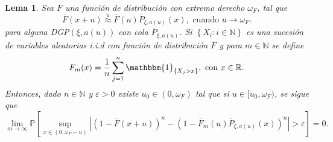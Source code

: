 \documentclass[10.5pt,notitlepage]{article}
\newcommand{\PP}{\mathbb{P}}
\newcommand{\RR}{\mathbb{R}}
\newcommand{\ee}{\varepsilon}
\newcommand{\NN}{\mathbb{N}}
\newcommand{\approxu}{\overset{u}{\approx}}
\newcommand{\abs}[1]{\left\lvert #1 \right\rvert}
\newcommand{\corch}[1]{\left[ #1 \right]}
\newcommand{\kis}[1]{\left\{ #1 \right\}}
\newcommand{\pare}[1]{\left( #1 \right)}
\theoremstyle{plain}
\newtheorem{lem}[thm]{Lema} %
\begin{document}
\begin{lem}\label{lem.2}
Sea \(F\) una función de distribución con extremo derecho \(\omega_F\), tal que 
\[
\overline{F}(x + u)\approxu \overline{F}(u)\overline{P}_{\xi, a(u)}(x), \text{ cuando } u \to \omega_{F}.
\]
para alguna DGP\((\xi, a(u))\) con cola \(\overline{P}_{\xi, a(u)}\). Si \(\kis{X_i : i \in \NN}\) es una sucesión de variables aleatorias i.i.d con función de distribución \(F\) y para \(m \in \NN\) se define 
\[
F_{m}(x) = \frac{1}{n} \sum_{j = 1}^{n}\mathbbm{1}_{\kis{X_{j} > x}}, \text{ con } x \in \RR. 
\]
Entonces, dado \(n \in \NN\) y \(\ee >0\) existe \(u_0 \in (0, \omega_{F})\) tal que si \(u \in[u_0,\omega_F)\), se sigue que 
\[
\lim_{m \to \infty}\PP\corch{ \sup_{x \in (0, \omega_{F} - u)}\abs{\pare{1 - \overline{F}(x + u)}^n -\pare{1- \overline{F}_{m}(u)\overline{P}_{\xi, a(u)}(x)}^n} > \ee}  = 0.
\]
\end{lem}
\end{document}

